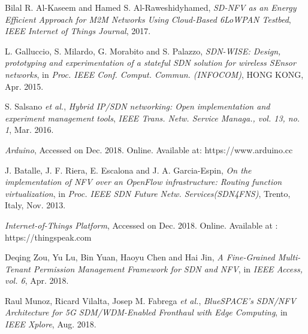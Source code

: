 \documentclass[10pt,journal,compsoc]{IEEEtran}
\begin{document}
\begin{thebibliography}{9}
Bilal R. Al-Kaseem and Hamed S. Al-Raweshidyhamed, 
\emph{SD-NFV as an Energy Efficient Approach for M2M Networks Using 
Cloud-Based 6LoWPAN Testbed}, \emph{IEEE Internet of Things Journal}, 2017.

L. Galluccio, S. Milardo, G. Morabito and S. Palazzo, 
\emph{SDN-WISE: Design, prototyping and experimentation of a stateful 
SDN solution for wireless SEnsor networks}, in
\emph{Proc. IEEE Conf. Comput. Commun. (INFOCOM)},
HONG KONG, Apr. 2015.

S. Salsano \emph{et al.},
\emph{Hybrid IP/SDN networking: Open implementation and experiment 
management tools},
\emph{IEEE Trans. Netw. Service Managa., vol. 13, no. 1}, Mar. 2016.

\emph{Arduino},
Accessed on Dec. 2018. Online. Available at: https://www.arduino.cc

J. Batalle, J. F. Riera, E. Escalona and J. A. Garcia-Espin,
\emph{On the implementation of NFV over an OpenFlow infrastructure: 
Routing function virtualization}, in
\emph{Proc. IEEE SDN Future Netw. Services(SDN4FNS)},
Trento, Italy, Nov. 2013.

\emph{Internet-of-Things Platform},
Accessed on Dec. 2018. Online. Available at : https://thingspeak.com

Deqing Zou, Yu Lu, Bin Yuan, Haoyu Chen and Hai Jin,
\emph{A Fine-Grained Multi-Tenant Permission Management Framework for 
SDN and NFV}, in
\emph{IEEE Access, vol. 6}, Apr. 2018.

Raul Munoz, Ricard Vilalta, Josep M. Fabrega \emph{et al.},
\emph{BlueSPACE's SDN/NFV Architecture for 5G SDM/WDM-Enabled Fronthaul 
with Edge Computing}, in
\emph{IEEE Xplore}, Aug. 2018.

\end{thebibliography}
\end{document}
